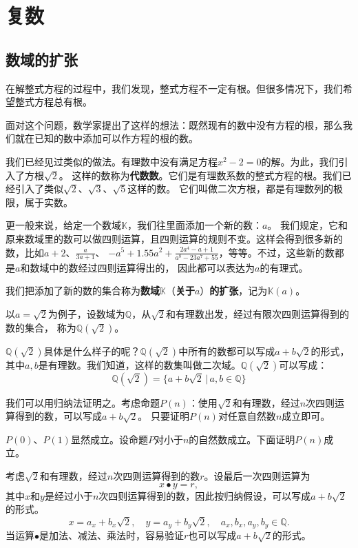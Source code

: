 \documentclass[12pt,UTF8]{ctexbook}
\theoremstyle{definition}
\theoremstyle{plain}
\begin{document}
\chapter{复数}

\section{数域的扩张}

在解整式方程的过程中，我们发现，整式方程不一定有根。但很多情况下，我们希望整式方程总有根。

面对这个问题，数学家提出了这样的想法：既然现有的数中没有方程的根，那么我们就在已知的数中添加可以作方程的根的数。

我们已经见过类似的做法。有理数中没有满足方程$x^2 - 2 = 0$的解。为此，我们引入了方根$\sqrt{2}$。
这样的数称为\textbf{代数数}。它们是有理数系数的整式方程的根。我们已经引入了类似$\sqrt{2}$、$\sqrt{3}$、$\sqrt{5}$这样的数。
它们叫做二次方根，都是有理数列的极限，属于实数。

更一般来说，给定一个数域$\mathbb{K}$，我们往里面添加一个新的数：$a$。
我们规定，它和原来数域里的数可以做四则运算，且四则运算的规则不变。这样会得到很多新的数，比如$a+2$、$\frac{a}{3a+1}$、
$- a^5 + 1.55a^2 + \frac{2a^4 - a + 1}{a^8 - 23a^7 + 55}$，等等。不过，这些新的数都是$a$和数域中的数经过四则运算得出的，
因此都可以表达为$a$的有理式。

我们把添加了新的数的集合称为\textbf{数域}$\mathbb{K}$（\textbf{关于}$a$）\textbf{的扩张}，记为$\mathbb{K}(a)$。

以$a = \sqrt{2}$为例子，设数域为$\mathbb{Q}$，从$\sqrt{2}$和有理数出发，经过有限次四则运算得到的数的集合，
称为$\mathbb{Q}(\sqrt{2})$。

$\mathbb{Q}(\sqrt{2})$具体是什么样子的呢？$\mathbb{Q}(\sqrt{2})$中所有的数都可以写成$a + b\sqrt{2}$的形式，
其中$a,b$是有理数。我们知道，这样的数集叫做二次域。$\mathbb{Q}(\sqrt{2})$可以写成：
$$ \mathbb{Q}(\sqrt{2}) = \{a + b\sqrt{2} \, | \, a, b \in\mathbb{Q}\}$$

我们可以用归纳法证明之。考虑命题$P(n)$：使用$\sqrt{2}$和有理数，经过$n$次四则运算得到的数，可以写成$a + b\sqrt{2}$。
只要证明$P(n)$对任意自然数$n$成立即可。

$P(0)$、$P(1)$显然成立。设命题$P$对小于$n$的自然数成立。下面证明$P(n)$成立。

考虑$\sqrt{2}$和有理数，经过$n$次四则运算得到的数$r$。设最后一次四则运算为
$$ x \bullet y = r,$$
其中$x$和$y$是经过小于$n$次四则运算得到的数，因此按归纳假设，可以写成$a + b\sqrt{2}$的形式。
$$ x = a_x + b_x\sqrt{2}, \quad y = a_y + b_y\sqrt{2}, \quad a_x, b_x, a_y, b_y \in \mathbb{Q}.$$
当运算$\bullet$是加法、减法、乘法时，容易验证$r$也可以写成$a + b\sqrt{2}$的形式。
\end{document}
